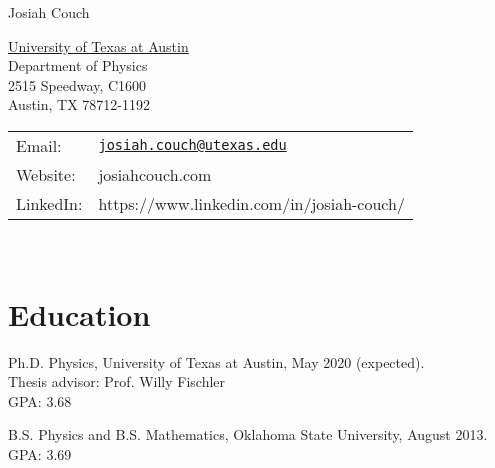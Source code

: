 \documentclass[letterpaper]{article}
\def\name{Josiah Couch}
\renewenvironment{itemize}{
  \begin{list}{}{
    \setlength{\leftmargin}{1.5em}
  }
}{
  \end{list}
}
\begin{document}
{\huge \name}


\vspace{0.25in}

\begin{minipage}{0.45\linewidth}
  \href{}{University of Texas at Austin} \\
  Department of Physics \\
  2515 Speedway, C1600 \\
  Austin, TX 78712-1192
\end{minipage}
\begin{minipage}{0.45\linewidth}
  \begin{tabular}{ll}
    Email: & \href{mailto:josiah.couch@utexas.edu}{\tt josiah.couch@utexas.edu} \\
    Website: & josiahcouch.com \\
    LinkedIn: & https://www.linkedin.com/in/josiah-couch/
  \end{tabular}
\end{minipage}
\

\section*{Education}

\begin{itemize}

\item Ph.D. Physics, University of Texas at Austin, \hfill  May 2020 (expected).\\
  Thesis advisor: Prof. Willy Fischler\\
  GPA: 3.68
  
  
  \item B.S. Physics and B.S. Mathematics, Oklahoma State University, \hfill August 2013.\\
  GPA: 3.69

\end{itemize}
\end{document}
